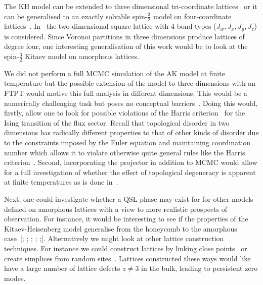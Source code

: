 The KH model can be extended to three dimensional tri-coordinate lattices~\autocite{eschmannThermodynamicClassificationThreedimensional2020,OBrienPRB2016} or it can be generalised to an exactly solvable spin-\(\tfrac{3}{2}\) model on four-coordinate lattices~\autocite{yaoAlgebraicSpinLiquid2009,wenQuantumOrderStringnet2003,ryuThreedimensionalTopologicalPhase2009,Baskaran2008,Nussinov2009,Yao2011,Chua2011,Natori2020,Chulliparambil2020,Chulliparambil2021,Seifert2020,WangHaoranPRB2021,Wu2009}. In~\autocite{yaoAlgebraicSpinLiquid2009} the two dimensional square lattice with 4 bond types (\(J_w, J_x, J_y, J_z\)) is considered. Since Voronoi partitions in three dimensions produce lattices of degree four, one interesting generalisation of this work would be to look at the spin-\(\tfrac{3}{2}\) Kitaev model on amorphous lattices.

We did not perform a full MCMC simulation of the AK model at finite temperature but the possible extension of the model to three dimensions with an FTPT would motive this full analysis in different dimensions. This would be a numerically challenging task but poses no conceptual barriers~\autocite{Laumann2012,lahtinenTopologicalLiquidNucleation2012,selfThermallyInducedMetallic2019}. Doing this would, firstly, allow one to look for possible violations of the Harris criterion~\autocite{harrisEffectRandomDefects1974} for the Ising transition of the flux sector. Recall that topological disorder in two dimensions has radically different properties to that of other kinds of disorder due to the constraints imposed by the Euler equation and maintaining coordination number which allows it to violate otherwise quite general rules like the Harris criterion~\autocite{barghathiPhaseTransitionsRandom2014,schrauthViolationHarrisBarghathiVojtaCriterion2018}. Second, incorporating the projector in addition to MCMC would allow for a full investigation of whether the effect of topological degeneracy is apparent at finite temperatures as is done in~\autocite{selfThermallyInducedMetallic2019}.

Next, one could investigate whether a QSL phase may exist for for other models defined on amorphous lattices with a view to more realistic prospects of observation. For instance, it would be interesting to see if the properties of the Kitaev-Heisenberg model generalise from the honeycomb to the amorphous case~{[}\textcite{Chaloupka2010}; \textcite{Chaloupka2015}; \textcite{Jackeli2009}; \textcite{Kalmeyer1989}; \textcite{manousakisSpinTextonehalfHeisenberg1991};{]}. Alternatively we might look at other lattice construction techniques. For instance we could construct lattices by linking close points~\autocite{agarwala2019topological} or create simplices from random sites~\autocite{christRandomLatticeField1982}. Lattices constructed these ways would like have a large number of lattice defects \(z \neq 3\) in the bulk, leading to persistent zero modes.

